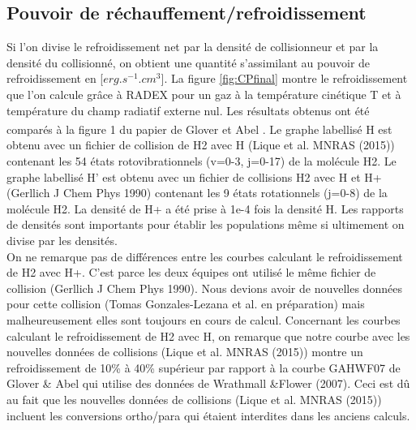 \documentclass[10pt, a4paper]{report}
\numberwithin{equation}{subsection}
\begin{document}

\subsection{Pouvoir de réchauffement/refroidissement}
Si l'on divise le refroidissement net par la densité de collisionneur et par la densité du collisionné, on obtient une quantité s'assimilant au pouvoir de refroidissement en [$erg.s^{-1}.cm^{3}$]. La figure \ref{fig:CPfinal} montre le refroidissement que l'on calcule grâce à RADEX pour un gaz à la température cinétique T et à température du champ radiatif externe nul. Les résultats obtenus ont été comparés à la figure 1 du papier de Glover et Abel \textsuperscript{\cite{Glover}}. Le graphe labellisé H est obtenu avec un fichier de collision de H2 avec H (Lique et al. MNRAS (2015)) contenant les 54 états rotovibrationnels (v=0-3, j=0-17) de la molécule H2. Le graphe labellisé H' est obtenu avec un fichier de collisions H2 avec H et H+ (Gerllich J Chem Phys 1990) contenant les 9 états rotationnels (j=0-8) de la molécule H2. La densité de H+ a été prise à 1e-4 fois la densité H. Les rapports de densités sont importants pour établir les populations même si ultimement on divise par les densités.\\
On ne remarque pas de différences entre les courbes calculant le refroidissement de H2 avec H+. C'est parce les deux équipes ont utilisé le même fichier de collision (Gerllich J Chem Phys 1990). Nous devions avoir de nouvelles données pour cette collision (Tomas Gonzales-Lezana et al. en préparation) mais malheureusement elles sont toujours en cours de calcul.
Concernant les courbes calculant le refroidissement de H2 avec H, on remarque que notre courbe avec les nouvelles données de collisions (Lique et al. MNRAS (2015)) montre un refroidissement de 10\% à 40\% supérieur par rapport à la courbe GAHWF07 de Glover \& Abel qui utilise des données de Wrathmall \&Flower (2007). Ceci est dû au fait que les nouvelles données de collisions (Lique et al. MNRAS (2015)) incluent les conversions ortho/para qui étaient interdites dans les anciens calculs.
\end{document}
